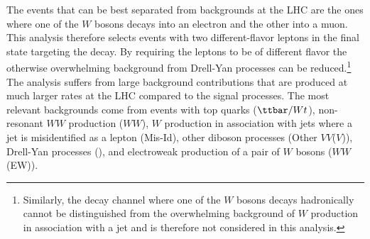 The \HWW events that can be best separated from backgrounds at the LHC are the ones where one of the $W$ bosons decays into an electron and the other into a muon.
This analysis therefore selects events with two different-flavor leptons in the final state targeting the \HWWdet decay. By requiring the leptons to be of different flavor the otherwise overwhelming background from Drell-Yan processes can be reduced.\footnote{Similarly, the decay channel where one of the $W$ bosons decays hadronically cannot be distinguished from the overwhelming background of $W$ production in association with a jet and is therefore not considered in this analysis.}
The analysis suffers from large background contributions that are produced at much larger rates at the LHC compared to the signal processes. The most relevant backgrounds come from events with top quarks ($\ttbar/Wt$), non-resonant $WW$ production ($WW$), $W$ production in association with jets where a jet is misidentified as a lepton (Mis-Id), other diboson processes (Other $VV$($V$)), Drell-Yan processes (\Zgamma), and electroweak production of a pair of $W$ bosons ($WW$ (EW)). 

